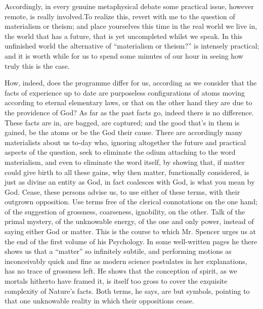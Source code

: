 \documentclass[12pt]{article}
\begin{document}
Accordingly, in every genuine metaphysical debate some practical issue, however remote, is really involved.To realize this, revert with me to the question of materialism or theism; and place yourselves this time in the real world we live in, the world that has a future, that is yet uncompleted whilst we speak. In this unfinished world the alternative of ``materialism or theism?'' is intensely practical; and it is worth while for us to spend some minutes of our hour in seeing how truly this is the case. 

How, indeed, does the programme differ for us, according as we consider that the facts of experience up to date are purposeless configurations of atoms moving according to eternal elementary laws, or that on the other hand they are due to the providence of God? As far as the past facts go, indeed there is no difference. These facts are in, are bagged, are captured; and the good that's in them is gained, be the atoms or be the God their cause. There are accordingly many materialists about us to-day who, ignoring altogether the future and practical aspects of the question, seek to eliminate the odium attaching to the word materialism, and even to eliminate the word itself, by showing that, if matter could give birth to all these gains, why then matter, functionally considered, is just as divine an entity as God, in fact coalesces with God, is what you mean by God. Cease, these persons advise us, to use either of these terms, with their outgrown opposition. Use terms free of the clerical connotations on the one hand; of the suggestion of grossness, coarseness, ignobility, on the other. Talk of the primal mystery, of the unknowable energy, of the one and only power, instead of saying either God or matter. This is the course to which Mr. Spencer urges us at the end of the first volume of his Psychology. In some well-written pages he there shows us that a ``matter'' so infinitely subtile, and performing motions as inconceivably quick and fine as modern science postulates in her explanations, has no trace of grossness left. He shows that the conception of spirit, as we mortals hitherto have framed it, is itself too gross to cover the exquisite complexity of Nature's facts. Both terms, he says, are but symbols, pointing to that one unknowable reality in which their oppositions cease. 
\end{document}

